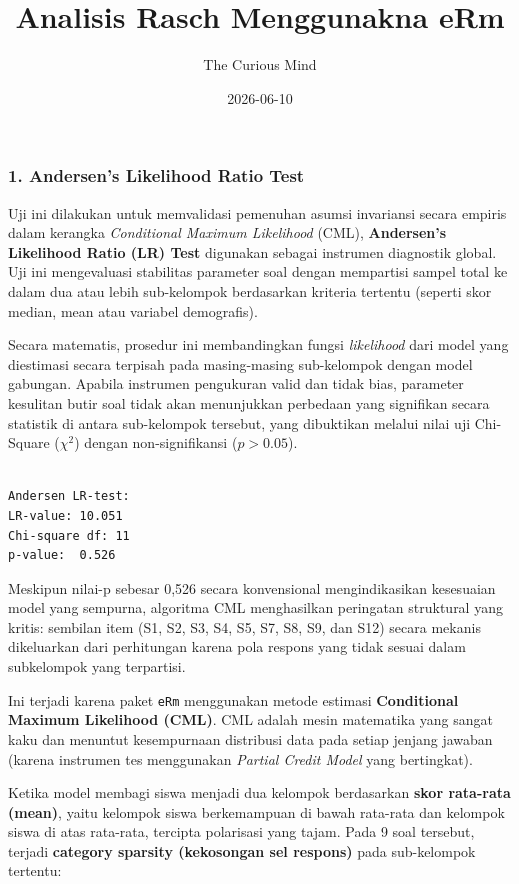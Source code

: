 \documentclass[
]{article}
\title{Analisis Rasch Menggunakna eRm}
\author{The Curious Mind}
\date{2026-06-10}
\begin{document}
\maketitle


\subsubsection{1. Andersen's Likelihood Ratio
Test}\label{andersens-likelihood-ratio-test}

Uji ini dilakukan untuk memvalidasi pemenuhan asumsi invariansi secara
empiris dalam kerangka \emph{Conditional Maximum Likelihood} (CML),
\textbf{Andersen's Likelihood Ratio (LR) Test} digunakan sebagai
instrumen diagnostik global. Uji ini mengevaluasi stabilitas parameter
soal dengan mempartisi sampel total ke dalam dua atau lebih sub-kelompok
berdasarkan kriteria tertentu (seperti skor median, mean atau variabel
demografis).

Secara matematis, prosedur ini membandingkan fungsi \emph{likelihood}
dari model yang diestimasi secara terpisah pada masing-masing
sub-kelompok dengan model gabungan. Apabila instrumen pengukuran valid
dan tidak bias, parameter kesulitan butir soal tidak akan menunjukkan
perbedaan yang signifikan secara statistik di antara sub-kelompok
tersebut, yang dibuktikan melalui nilai uji Chi-Square (\(\chi^2\))
dengan non-signifikansi (\(p > 0.05\)).

\begin{verbatim}

Andersen LR-test: 
LR-value: 10.051 
Chi-square df: 11 
p-value:  0.526 
\end{verbatim}

Meskipun nilai-p sebesar 0,526 secara konvensional mengindikasikan
kesesuaian model yang sempurna, algoritma CML menghasilkan peringatan
struktural yang kritis: sembilan item (S1, S2, S3, S4, S5, S7, S8, S9,
dan S12) secara mekanis dikeluarkan dari perhitungan karena pola respons
yang tidak sesuai dalam subkelompok yang terpartisi.

Ini terjadi karena paket \texttt{eRm} menggunakan metode estimasi
\textbf{Conditional Maximum Likelihood (CML)}. CML adalah mesin
matematika yang sangat kaku dan menuntut kesempurnaan distribusi data
pada setiap jenjang jawaban (karena instrumen tes menggunakan
\emph{Partial Credit Model} yang bertingkat).

Ketika model membagi siswa menjadi dua kelompok berdasarkan \textbf{skor
rata-rata (mean)}, yaitu kelompok siswa berkemampuan di bawah rata-rata
dan kelompok siswa di atas rata-rata, tercipta polarisasi yang tajam.
Pada 9 soal tersebut, terjadi \textbf{category sparsity (kekosongan sel
respons)} pada sub-kelompok tertentu:
\end{document}

